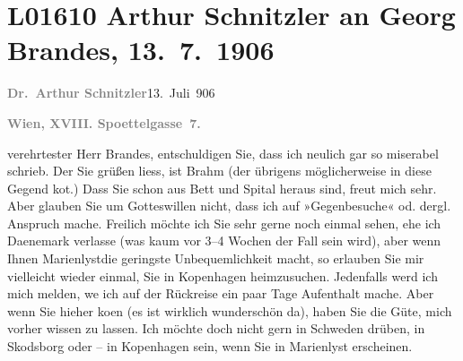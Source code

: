 

\section[Arthur Schnitzler an Georg Brandes, 13. 7. 1906]{L01610 Arthur Schnitzler an Georg Brandes, 13. 7. 1906}
\nopagebreak{}
\rehead{ }\normalsize\beginnumbering{}
\toendnotes[C]{\smallbreak\pagebreak[2]}
\pstart
           {\pb}\textcolor{gray}{\textbf{Dr. Arthur Schnitzler}}\hfill 13. Juli 906\pend
           
\pstart
           \textcolor{gray}{\textbf{Wien, XVIII. Spoettelgasse 7.}}\pend
           
\pstart{}verehrtester Herr Brandes,\pend\vspace{0.5em}
\pstart
           entschuldigen Sie, dass ich neulich gar so miserabel schrieb. Der Sie grüßen liess,
               ist Brahm (der übrigens möglicherweise in
               diese Gegend ko{\geminationm}t.) Dass Sie schon aus Bett und Spital
               heraus sind, freut mich sehr. Aber glauben Sie um Gotteswillen nicht, dass ich auf
               »Gegenbesuche« od. dergl. Anspruch mache. Freilich möchte ich Sie sehr gerne noch
               einmal sehen, ehe ich Daenemark verlasse (was
               kaum vor 3–4 Wochen der Fall sein wird), aber wenn Ihnen Marienlystdie geringste Unbequemlichkeit macht, so erlauben
               Sie mir vielleicht wieder einmal, Sie in Kopenhagen heimzusuchen. Jedenfalls werd ich mich melden, we{\geminationn} ich auf der Rückreise ein paar Tage Aufenthalt mache.
               Aber wenn Sie hieher ko{\geminationm}en (es ist wirklich wunderschön
               da), haben Sie die Güte, mich vorher wissen zu lassen. Ich möchte doch nicht gern in
                  Schweden drüben, in Skodsborg oder – in Kopenhagen sein, wenn Sie in Marienlyst
               erscheinen.\pend
           
